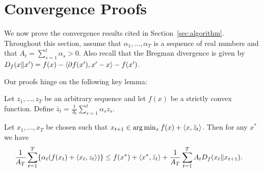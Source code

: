 \documentclass[paper.tex]{subfiles}
\begin{document}
\section{Convergence Proofs}
\label{sec:proofs}
We now prove the convergence results cited in Section~\ref{sec:algorithm}. 
Throughout this section, assume that $\alpha_1,\ldots,\alpha_T$ is 
a sequence of real numbers and that $A_t = \sum_{s=1}^t \alpha_s > 0$. 
Also recall that the Bregman divergence is given by 
$ D_f(x \| x') = f(x)-\left\langle \partial f(x'), x'-x \right\rangle - f(x')$.

Our proofs hinge on the following key lemma:
\begin{lemma}
\label{lem:bregman}
Let $z_1,\ldots,z_T$ be an arbitrary sequence and let $f(x)$ be a strictly convex 
function. Define $\bar{z}_t = \frac{1}{A_t} \sum_{s=1}^t \alpha_s z_s$.

Let $x_1,\ldots,x_T$ be chosen such that $x_{t+1} \in \arg\min_{x} f(x) + \left\langle x, \bar{z}_t \right\rangle$. 
Then for any $x^*$ we have
\begin{align*}
\frac{1}{A_T} \sum_{t=1}^T \{\alpha_t(f(x_t) + \left\langle x_{t}, z_{t} \right\rangle)\}
&\leq f(x^*) + \left\langle x^{*}, \bar{z}_t \right\rangle + \frac{1}{A_T} \sum_{t=1}^T A_t D_{f}(x_t \| x_{t+1}). 
\end{align*}
\end{lemma}
\end{document}
